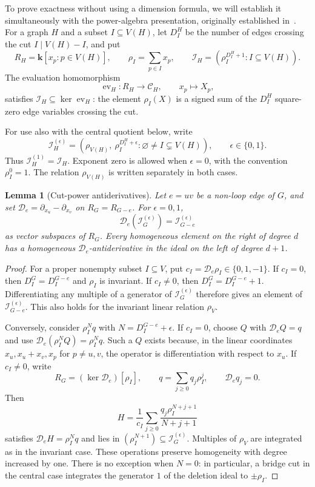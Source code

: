 \documentclass[reqno]{article}
\theoremstyle{plain} %
\newtheorem{lemma}[theorem]{Lemma}
\theoremstyle{definition}
\theoremstyle{remark}
\newcommand{\K} {\mathbf{k}}
\newcommand {\CC}{\mathscr{C}}
\numberwithin{equation}{section}
\begin{document}
To prove exactness without using a dimension formula, we will establish it
simultaneously with the power-algebra presentation, originally
established in~\cite{Wa1,PSS}.  For a graph $H$ and a subset $I\subseteq V(H)$,
let $D_I^H$ be the number of edges crossing the cut $I\mid V(H)-I$, and put
\[
R_H=\K[x_p:p\in V(H)],\qquad
\rho_I=\sum_{p\in I}x_p,\qquad
\mathcal I_H=(\rho_I^{D_I^H+1}:I\subseteq V(H)).
\]
The evaluation homomorphism
\[
\operatorname{ev}_H\colon R_H\longrightarrow\CC_H,\qquad x_p\longmapsto X_p,
\]
satisfies $\mathcal I_H\subseteq\ker\operatorname{ev}_H$: the element
$\rho_I(X)$ is a signed sum of the $D_I^H$ square-zero edge variables
crossing the cut.

For use also with the central quotient below, write
\begin{equation}\label{eq:two-power-ideals}
\mathcal I_H^{(\epsilon)}=
\left(\rho_{V(H)},\ \rho_I^{D_I^H+\epsilon}:
\varnothing\ne I\subsetneq V(H)\right),\qquad \epsilon\in\{0,1\}.
\end{equation}
Thus $\mathcal I_H^{(1)}=\mathcal I_H$. Exponent zero is allowed when
$\epsilon=0$, with the convention $\rho_I^0=1$. The relation
$\rho_{V(H)}$ is written separately in both cases.

\begin{lemma}[Cut-power antiderivatives]\label{lem:cut-antiderivative}
Let $e=uv$ be a non-loop edge of $G$, and set
$\mathcal D_e=\partial_{x_u}-\partial_{x_v}$ on $R_G=R_{G-e}$.
For $\epsilon=0,1$,
\begin{equation}\label{eq:cut-antiderivative}
\mathcal D_e(\mathcal I_G^{(\epsilon)})
=\mathcal I_{G-e}^{(\epsilon)}
\end{equation}
as vector subspaces of $R_G$. Every homogeneous element on the right of
degree $d$ has a homogeneous $\mathcal D_e$-antiderivative in the ideal
on the left of degree $d+1$.
\end{lemma}
\begin{proof}
For a proper nonempty subset $I\subseteq V$, put
$c_I=\mathcal D_e\rho_I\in\{0,1,-1\}$.
If $c_I=0$, then $D_I^G=D_I^{G-e}$ and $\rho_I$ is invariant.
If $c_I\ne0$, then $D_I^G=D_I^{G-e}+1$.
Differentiating any multiple of a generator of
$\mathcal I_G^{(\epsilon)}$ therefore gives an element of
$\mathcal I_{G-e}^{(\epsilon)}$. This also holds for the invariant
linear relation $\rho_V$.

Conversely, consider $\rho_I^Nq$ with $N=D_I^{G-e}+\epsilon$.
If $c_I=0$, choose $Q$ with $\mathcal D_eQ=q$ and use
$\mathcal D_e(\rho_I^NQ)=\rho_I^Nq$. Such a $Q$ exists because, in the
linear coordinates $x_u,x_u+x_v,x_p$ for $p\ne u,v$, the operator is
differentiation with respect to $x_u$.
If $c_I\ne0$, write
\[
R_G=(\ker\mathcal D_e)[\rho_I],\qquad
q=\sum_{j\ge0}q_j\rho_I^j,\qquad \mathcal D_eq_j=0.
\]
Then
\[
H=\frac1{c_I}\sum_{j\ge0}
\frac{q_j\rho_I^{N+j+1}}{N+j+1}
\]
satisfies $\mathcal D_eH=\rho_I^Nq$ and lies in
$(\rho_I^{N+1})\subseteq\mathcal I_G^{(\epsilon)}$.
Multiples of $\rho_V$ are integrated as in the invariant case.
These operations preserve homogeneity with degree increased by one.
There is no exception when $N=0$: in particular, a bridge cut in the
central case integrates the generator $1$ of the deletion ideal to
$\pm\rho_I$.
\end{proof}
\end{document}
